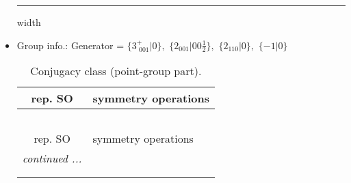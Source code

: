 \documentclass[fleqn,10pt,landscape]{article}
\begin{document}
\begin{itemize}
 \hfil \hrule height 1mm width \textwidth \hfil

\item Group info.: Generator = $\{3^{+}_{\,\,001}|0\},\,\,\{2{}_{001}|0 0 \frac{1}{2}\},\,\,\{2{}_{110}|0\},\,\,\{-1|0\}$

\begin{center}
\renewcommand{\arraystretch}{1.3}
\begin{longtable}{c|l}
\caption{Conjugacy class (point-group part).}
 \\
 \hline \hline
rep. SO & symmetry operations \\ \hline \endfirsthead

\multicolumn{1}{l}{\tablename\ \thetable{}} \\
 \hline \hline
rep. SO & symmetry operations \\ \hline \endhead

 \hline \hline
\multicolumn{1}{r}{\footnotesize\it continued ...} \\ \endfoot

 \hline \hline
\multicolumn{1}{r}{} \\ \endlastfoot


\end{longtable}
\end{center}
\end{itemize}
\end{document}
